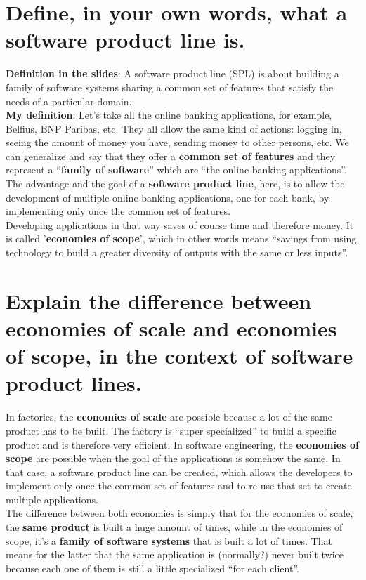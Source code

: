\section{Define, in your own words, what a software product line is.}

\textbf{Definition in the slides}: A software product line (SPL) is about building a family of software systems sharing a common set of features that satisfy the needs of a particular domain. \\

\textbf{My definition}: Let’s take all the online banking applications, for example, Belfius, BNP Paribas, etc. They all allow the same kind of actions: logging in, seeing the amount of money you have, sending money to other persons, etc. We can generalize and say that they offer a \textbf{common set of features} and they represent a “\textbf{family of software}” which are “the online banking applications”. \\
The advantage and the goal of a \textbf{software product line}, here, is to allow the development of multiple online banking applications, one for each bank, by implementing only once the common set of features.\\

Developing applications in that way saves of course time and therefore money. It is called '\textbf{economies of scope}', which in other words means “savings from using technology to build a greater diversity of outputs with the same or less inputs”.

\section{Explain the difference between economies of scale and economies of scope, in the context
of software product lines.}

In factories, the \textbf{economies of scale} are possible because a lot of the same product has to be built. The factory is “super specialized” to build a specific product and is therefore very efficient.
In software engineering, the \textbf{economies of scope} are possible when the goal of the applications is somehow the same. In that case, a software product line can be created, which allows the developers to implement only once the common set of features and to re-use that set to create multiple applications. \\

The difference between both economies is simply that for the economies of scale, the \textbf{same product} is built a huge amount of times, while in the economies of scope, it’s a \textbf{family of software systems} that is built a lot of times. That means for the latter that the same application is (normally?) never built twice because each one of them is still a little specialized “for each client”.

